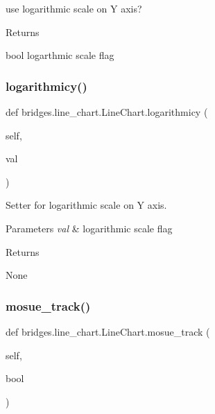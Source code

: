 use logarithmic scale on Y axis? 

\begin{DoxyReturn}{Returns}


bool logarthmic scale flag 
\end{DoxyReturn}
\mbox{\label{classbridges_1_1line__chart_1_1_line_chart_ac29eaedd760a3f608f7b11193befa1c5}} 
\subsubsection{\texorpdfstring{logarithmicy()}{logarithmicy()}\hspace{0.1cm}{\footnotesize\ttfamily [2/2]}}
{\footnotesize\ttfamily def bridges.\+line\+\_\+chart.\+Line\+Chart.\+logarithmicy (\begin{DoxyParamCaption}\item[{}]{self,  }\item[{}]{val }\end{DoxyParamCaption})}



Setter for logarithmic scale on Y axis. 


\begin{DoxyParams}{Parameters}
{\em val} & logarithmic scale flag \\
\hline
\end{DoxyParams}
\begin{DoxyReturn}{Returns}


None 
\end{DoxyReturn}
\mbox{\label{classbridges_1_1line__chart_1_1_line_chart_ad189e3efb7abb05944067fc171f6baf8}} 
\subsubsection{\texorpdfstring{mosue\+\_\+track()}{mosue\_track()}\hspace{0.1cm}{\footnotesize\ttfamily [1/2]}}
{\footnotesize\ttfamily def bridges.\+line\+\_\+chart.\+Line\+Chart.\+mosue\+\_\+track (\begin{DoxyParamCaption}\item[{}]{self,  }\item[{}]{bool }\end{DoxyParamCaption})}



